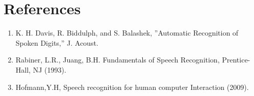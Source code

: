 \documentclass[12pt, a4paper, twoside]{report}
\begin{document}
\section*{References}
\begin{enumerate}
\item K. H. Davis, R. Biddulph, and S. Balashek, ”Automatic Recognition of Spoken Digits,” 
J. Acoust.
\item Rabiner, L.R., Juang, B.H. Fundamentals of Speech Recognition, Prentice-Hall, NJ (1993).
\item Hofmann,Y.H, Speech recognition for human computer Interaction (2009).
\end{enumerate}
\end{document}
